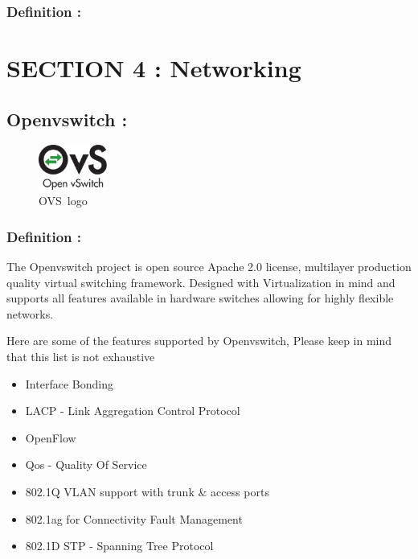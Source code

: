 \documentclass[
  14pt,
  english,
  a4paper,
]{scrreprt}
\providecommand{\tightlist}{%
  \setlength{\itemsep}{0pt}\setlength{\parskip}{0pt}}
\begin{document}
\hypertarget{definition-9}{%
\subsubsection{Definition :}\label{definition-9}}

\hypertarget{section-4-networking}{%
\section{SECTION 4 : Networking}\label{section-4-networking}}

\hypertarget{openvswitch}{%
\subsection{Openvswitch :}\label{openvswitch}}

\begin{figure}
\centering
\includegraphics[width=0.2\textwidth,height=\textheight]{figures/Openvswitch-logo.png}
\caption{OVS~logo}
\end{figure}

\hypertarget{definition-10}{%
\subsubsection{Definition :}\label{definition-10}}

The Openvswitch project is open source Apache 2.0 license, multilayer
production quality virtual switching framework. Designed with
Virtualization in mind and supports all features available in hardware
switches allowing for highly flexible networks.

Here are some of the features supported by Openvswitch, Please keep in
mind that this list is not exhaustive

\begin{itemize}
\tightlist
\item
  Interface Bonding
\item
  LACP - Link Aggregation Control Protocol
\item
  OpenFlow
\item
  Qos - Quality Of Service
\item
  802.1Q VLAN support with trunk \& access ports
\item
  802.1ag for Connectivity Fault Management
\item
  802.1D STP - Spanning Tree Protocol
\end{itemize}
\end{document}
